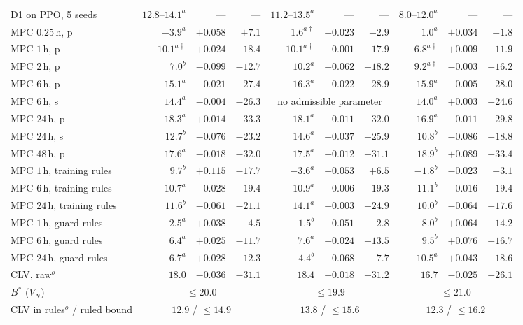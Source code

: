 \documentclass[pdflatex,sn-mathphys-num,iicol]{sn-jnl}
\theoremstyle{thmstyleone}\newtheorem{proposition}{Proposition}\newtheorem{corollary}{Corollary}
\theoremstyle{thmstyletwo}\newtheorem{remark}{Remark}\newtheorem{observation}{Observation}
\theoremstyle{thmstylethree}\newtheorem{definition}{Definition}
\begin{document}
\begin{table}[t]
\begin{tabular*}{\textwidth}{@{\extracolsep{\fill}}lrrrrrrrrr@{}}
D1 on PPO, 5 seeds & $12.8$--$14.1^{a}$ & --- & --- & $11.2$--$13.5^{a}$ & --- & --- & $8.0$--$12.0^{a}$ & --- & --- \\
MPC $0.25\,$h, p & $-3.9^{a}$ & $+0.058$ & $+7.1$ & $1.6^{a\dagger}$ & $+0.023$ & $-2.9$ & $1.0^{a}$ & $+0.034$ & $-1.8$ \\
MPC $1\,$h, p & $10.1^{a\dagger}$ & $+0.024$ & $-18.4$ & $10.1^{a\dagger}$ & $+0.001$ & $-17.9$ & $6.8^{a\dagger}$ & $+0.009$ & $-11.9$ \\
MPC $2\,$h, p & $7.0^{b}$ & $-0.099$ & $-12.7$ & $10.2^{a}$ & $-0.062$ & $-18.2$ & $9.2^{a\dagger}$ & $-0.003$ & $-16.2$ \\
MPC $6\,$h, p & $15.1^{a}$ & $-0.021$ & $-27.4$ & $16.3^{a}$ & $+0.022$ & $-28.9$ & $15.9^{a}$ & $-0.005$ & $-28.0$ \\
MPC $6\,$h, s & $14.4^{a}$ & $-0.004$ & $-26.3$ & \multicolumn{3}{c}{\footnotesize no admissible parameter} & $14.0^{a}$ & $+0.003$ & $-24.6$ \\
MPC $24\,$h, p & $18.3^{a}$ & $+0.014$ & $-33.3$ & $18.1^{a}$ & $-0.011$ & $-32.0$ & $16.9^{a}$ & $-0.011$ & $-29.8$ \\
MPC $24\,$h, s & $12.7^{b}$ & $-0.076$ & $-23.2$ & $14.6^{a}$ & $-0.037$ & $-25.9$ & $10.8^{b}$ & $-0.086$ & $-18.8$ \\
MPC $48\,$h, p & $17.6^{a}$ & $-0.018$ & $-32.0$ & $17.5^{a}$ & $-0.012$ & $-31.1$ & $18.9^{b}$ & $+0.089$ & $-33.4$ \\
MPC $1\,$h, training rules & $9.7^{b}$ & $+0.115$ & $-17.7$ & $-3.6^{a}$ & $-0.053$ & $+6.5$ & $-1.8^{b}$ & $-0.023$ & $+3.1$ \\
MPC $6\,$h, training rules & $10.7^{a}$ & $-0.028$ & $-19.4$ & $10.9^{a}$ & $-0.006$ & $-19.3$ & $11.1^{b}$ & $-0.016$ & $-19.4$ \\
MPC $24\,$h, training rules & $11.6^{b}$ & $-0.061$ & $-21.1$ & $14.1^{a}$ & $-0.003$ & $-24.9$ & $10.0^{b}$ & $-0.064$ & $-17.6$ \\
MPC $1\,$h, guard rules & $2.5^{a}$ & $+0.038$ & $-4.5$ & $1.5^{b}$ & $+0.051$ & $-2.8$ & $8.0^{b}$ & $+0.064$ & $-14.2$ \\
MPC $6\,$h, guard rules & $6.4^{a}$ & $+0.025$ & $-11.7$ & $7.6^{a}$ & $+0.024$ & $-13.5$ & $9.5^{b}$ & $+0.076$ & $-16.7$ \\
MPC $24\,$h, guard rules & $6.7^{a}$ & $+0.028$ & $-12.3$ & $4.4^{b}$ & $+0.068$ & $-7.7$ & $10.5^{a}$ & $+0.043$ & $-18.6$ \\
CLV, raw$^{o}$ & $18.0$ & $-0.036$ & $-31.1$ & $18.4$ & $-0.018$ & $-31.2$ & $16.7$ & $-0.025$ & $-26.1$ \\
$B^{\ast}$ ($V_N$) & \multicolumn{3}{c}{$\le20.0$} & \multicolumn{3}{c}{$\le19.9$} & \multicolumn{3}{c}{$\le21.0$} \\
CLV in rules$^{o}$ / ruled bound & \multicolumn{3}{c}{$12.9$ / $\le14.9$} & \multicolumn{3}{c}{$13.8$ / $\le15.6$} & \multicolumn{3}{c}{$12.3$ / $\le16.2$} \\
\bottomrule
\end{tabular*}
\end{table}
\end{document}
